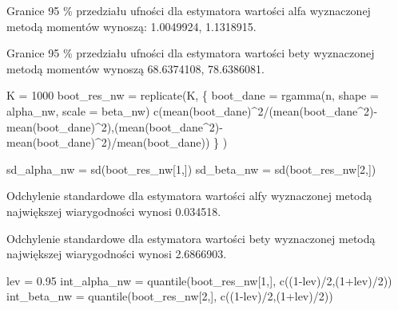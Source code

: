 \documentclass[
]{article}
\newenvironment{Shaded}{\begin{snugshade}}{\end{snugshade}}
\newcommand{\AttributeTok}[1]{\textcolor[rgb]{0.77,0.63,0.00}{#1}}
\newcommand{\DecValTok}[1]{\textcolor[rgb]{0.00,0.00,0.81}{#1}}
\newcommand{\FloatTok}[1]{\textcolor[rgb]{0.00,0.00,0.81}{#1}}
\newcommand{\FunctionTok}[1]{\textcolor[rgb]{0.00,0.00,0.00}{#1}}
\newcommand{\NormalTok}[1]{#1}
\newcommand{\OtherTok}[1]{\textcolor[rgb]{0.56,0.35,0.01}{#1}}
\newcommand{\SpecialCharTok}[1]{\textcolor[rgb]{0.00,0.00,0.00}{#1}}
\begin{document}
Granice 95 \% przedziału ufności dla estymatora wartości alfa
wyznaczonej metodą momentów wynoszą: 1.0049924, 1.1318915.

Granice 95 \% przedziału ufności dla estymatora wartości bety
wyznaczonej metodą momentów wynoszą 68.6374108, 78.6386081.

\begin{Shaded}
\begin{Highlighting}[]
\NormalTok{K }\OtherTok{=} \DecValTok{1000}
\NormalTok{boot\_res\_nw }\OtherTok{=} \FunctionTok{replicate}\NormalTok{(K, \{}
\NormalTok{boot\_dane }\OtherTok{=} \FunctionTok{rgamma}\NormalTok{(n, }\AttributeTok{shape =}\NormalTok{ alpha\_nw, }\AttributeTok{scale =}\NormalTok{ beta\_nw)}
\FunctionTok{c}\NormalTok{(}\FunctionTok{mean}\NormalTok{(boot\_dane)}\SpecialCharTok{\^{}}\DecValTok{2}\SpecialCharTok{/}\NormalTok{(}\FunctionTok{mean}\NormalTok{(boot\_dane}\SpecialCharTok{\^{}}\DecValTok{2}\NormalTok{)}\SpecialCharTok{{-}}\FunctionTok{mean}\NormalTok{(boot\_dane)}\SpecialCharTok{\^{}}\DecValTok{2}\NormalTok{),(}\FunctionTok{mean}\NormalTok{(boot\_dane}\SpecialCharTok{\^{}}\DecValTok{2}\NormalTok{)}\SpecialCharTok{{-}}\FunctionTok{mean}\NormalTok{(boot\_dane)}\SpecialCharTok{\^{}}\DecValTok{2}\NormalTok{)}\SpecialCharTok{/}\FunctionTok{mean}\NormalTok{(boot\_dane))}
\NormalTok{\} )}

\NormalTok{sd\_alpha\_nw }\OtherTok{=} \FunctionTok{sd}\NormalTok{(boot\_res\_nw[}\DecValTok{1}\NormalTok{,])}
\NormalTok{sd\_beta\_nw }\OtherTok{=} \FunctionTok{sd}\NormalTok{(boot\_res\_nw[}\DecValTok{2}\NormalTok{,])}
\end{Highlighting}
\end{Shaded}

Odchylenie standardowe dla estymatora wartości alfy wyznaczonej metodą
największej wiarygodności wynosi 0.034518.

Odchylenie standardowe dla estymatora wartości bety wyznaczonej metodą
największej wiarygodności wynosi 2.6866903.

\begin{Shaded}
\begin{Highlighting}[]
\NormalTok{lev }\OtherTok{=} \FloatTok{0.95}
\NormalTok{int\_alpha\_nw }\OtherTok{=} \FunctionTok{quantile}\NormalTok{(boot\_res\_nw[}\DecValTok{1}\NormalTok{,], }\FunctionTok{c}\NormalTok{((}\DecValTok{1}\SpecialCharTok{{-}}\NormalTok{lev)}\SpecialCharTok{/}\DecValTok{2}\NormalTok{,(}\DecValTok{1}\SpecialCharTok{+}\NormalTok{lev)}\SpecialCharTok{/}\DecValTok{2}\NormalTok{))}
\NormalTok{int\_beta\_nw }\OtherTok{=} \FunctionTok{quantile}\NormalTok{(boot\_res\_nw[}\DecValTok{2}\NormalTok{,], }\FunctionTok{c}\NormalTok{((}\DecValTok{1}\SpecialCharTok{{-}}\NormalTok{lev)}\SpecialCharTok{/}\DecValTok{2}\NormalTok{,(}\DecValTok{1}\SpecialCharTok{+}\NormalTok{lev)}\SpecialCharTok{/}\DecValTok{2}\NormalTok{))}
\end{Highlighting}
\end{Shaded}
\end{document}
